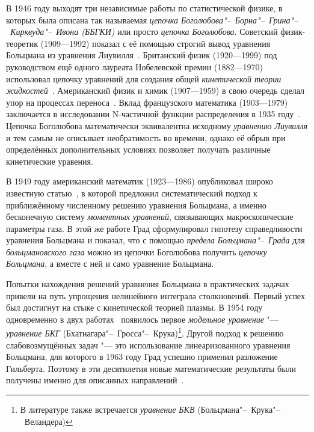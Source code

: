 \documentclass[a4paper, 12pt, oneside]{article} %
\begin{document}
В 1946 году выходят три независимые работы по статистической физике, в
которых была описана так называемая \emph{цепочка
Боголюбова"--~Борна"--~Грина"--~Кирквуда"--~Ивона (ББГКИ)} или просто
\emph{цепочка Боголюбова}. Советский физик-теоретик  (1909---1992) показал с её помощью строгий вывод уравнения
Больцмана из уравнения Лиувилля~\cite{bogolyubov1946kinetic}. Британский
физик  (1920---1999) под руководством ещё одного
лауреата Нобелевской премии  (1882---1970)
использовал цепочку уравнений для создания общей \emph{кинетической
теории жидкостей}~\cite{born1946general}. Американский физик и химик
 (1907---1959) в свою очередь сделал упор на
процессах переноса~\cite{kirkwood1946statistical}. Вклад французского
математика  (1903---1979) заключается в исследовании
N-частичной функции распределения в 1935 году~\cite{yvon1935theorie}.
Цепочка Боголюбова математически эквивалентна исходному \emph{уравнению
Лиувилля} и тем самым не описывает необратимость во времени, однако её
обрыв при определённых дополнительных условиях позволяет получать
различные кинетические уравения. 

В 1949 году американский математик  (1923---1986)
опубликовал широко известную статью~\cite{grad1949kinetic}, в которой
предложил систематический подход к приближённому численному решению
уравнения Больцмана, а именно бесконечную систему \emph{моментных
уравнений}, связывающих макроскопические параметры газа. В этой же
работе Град сформулировал гипотезу справедливости уравнения Больцмана и
показал, что с помощью \emph{предела Больцмана"--~Града} для
\emph{больцмановского газа} можно из цепочки Боголюбова получить
\emph{цепочку Больцмана}, а вместе с ней и само уравнение Больцмана.

Попытки нахождения решений уравнения Больцмана в практических задачах
привели на путь упрощения нелинейного интеграла столкновений. Первый
успех был достигнут на стыке с кинетической теорией плазмы. В 1954 году
одновременно в двух работах~\cite{bhatnagar1954model,
welander1954temperature} появилось первое \emph{модельное уравнение}
"--- \emph{уравнение БКГ} (Бхатнагара"--~Гросса"--~Крука)\footnote{В
литературе также встречается \emph{уравнение БКВ}
(Больцмана"--~Крука"--~Веландера)}. Другой подход к решению
слабовозмущённых задач "--- это использование линеаризованного уравнения
Больцмана, для которого в 1963 году Град успешно применил разложение
Гильберта. Поэтому в эти десятилетия новые математические результаты
были получены именно для описанных
направлений~\cite{cercignani1973mathematical}.
\end{document}
